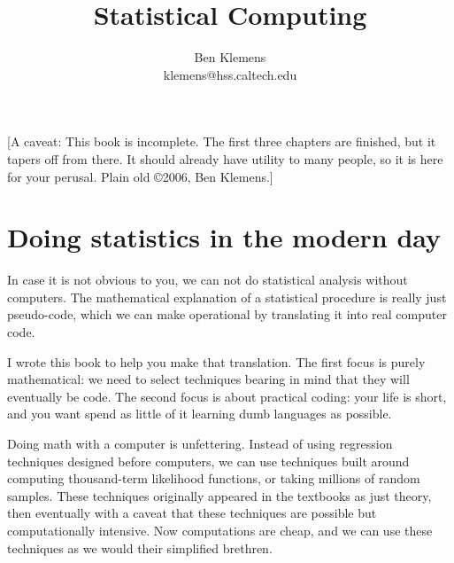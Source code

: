 \documentclass[12pt,notitlepage, openany]{book}
\begin{document}
\frontmatter
\title{Statistical Computing}
\author{Ben Klemens\\klemens@hss.caltech.edu}
\begin{center}
\fbox{\begin{minipage}{4in}
\maketitle
\end{minipage}}
\end{center}
\thispagestyle{empty}
\vfill
[A caveat: This book is incomplete. The
first three chapters are finished, but it tapers off from there. It should
already have utility to many people, so it is here for your perusal.
Plain old \copyright 2006, Ben Klemens.]


\setcounter{tocdepth}{1}
\tableofcontents
\mainmatter\chapter[Introduction]{Doing statistics in the modern day}


In case it is not obvious to you, we can not do statistical analysis without
computers. The mathematical explanation of a statistical procedure is
really just pseudo-code, which we can make operational by translating
it into real computer code.

I wrote this book to help you make that translation. The first focus
is purely mathematical: we need to select techniques bearing in mind
that they will eventually be code. The second focus is about practical
coding: your life is short, and you want spend as little of it learning
dumb languages as possible.

Doing math with a computer is unfettering. Instead of using regression
techniques designed before computers, we can use techniques built around
computing thousand-term likelihood functions, or taking millions of
random samples. These techniques originally appeared in the textbooks
as just theory, then eventually with a caveat that these techniques
are possible but computationally intensive. Now computations are cheap,
and we can use these techniques as we would their simplified brethren.
\end{document}
